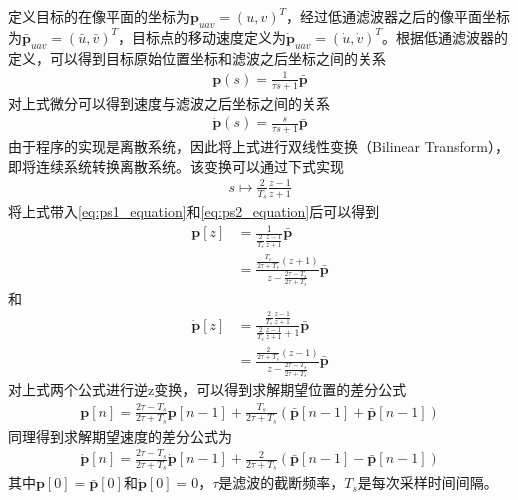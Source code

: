 定义目标的在像平面的坐标为$\mathbf{p}_{uav} = (u, v)^T$，经过低通滤波器之后的像平面坐标为$\bar{\mathbf{p}}_{uav} = (\bar{u}, \bar{v})^T$，目标点的移动速度定义为$\dot{\mathbf{p}}_{uav} = (\dot{u},\dot{v})^T$。根据低通滤波器的定义，可以得到目标原始位置坐标和滤波之后坐标之间的关系
\begin{align}
\label{eq:ps1_equation}
\mathbf{p}(s) = \frac{1}{\tau s+1}\bar{\mathbf{p}}
\end{align}
对上式微分可以得到速度与滤波之后坐标之间的关系
\begin{align}
\label{eq:ps2_equation}
\dot{\mathbf{p}}(s) = \frac{s}{\tau s+1}\bar{\mathbf{p}}
\end{align}
由于程序的实现是离散系统，因此将上式进行双线性变换（Bilinear Transform）\cite{franklin1998digital}，即将连续系统转换离散系统。该变换可以通过下式实现
\begin{align}
s \mapsto \frac{2}{T_s}\frac{z-1}{z+1}
\end{align}
将上式带入\ref{eq:ps1_equation}和\ref{eq:ps2_equation}后可以得到
\begin{align}
\mathbf{p}[z] &= \frac{1}{\frac{2}{T_s}\frac{z-1}{z+1}}\bar{\mathbf{p}} \\
&= \frac{\frac{T_s}{2\tau+T_s}(z+1)}{z-\frac{2\tau-T_s}{2\tau+T_s}}\bar{\mathbf{p}}
\end{align}
和
\begin{align}
\dot{\mathbf{p}}[z] &= \frac{\frac{2}{T_s}\frac{z-1}{z+1}}{\frac{2}{T_s}\frac{z-1}{z+1}+1}\bar{\mathbf{p}} \\
&= \frac{\frac{2}{2\tau+T_s}(z-1)}{z-\frac{2\tau-T_s}{2\tau+T_s}}\bar{\mathbf{p}}
\end{align}
对上式两个公式进行逆z变换，可以得到求解期望位置的差分公式
\begin{align}
\mathbf{p}[n] = \frac{2\tau-T_s}{2\tau+T_s} \mathbf{p}[n-1]+ \frac{T_s}{2\tau+T_s}(\bar{\mathbf{p}}[n-1] + \bar{\mathbf{p}}[n-1] )
\end{align}
同理得到求解期望速度的差分公式为
\begin{align}
\dot{\mathbf{p}}[n] = \frac{2\tau-T_s}{2\tau+T_s}\dot{\mathbf{p}}[n-1]+ \frac{2}{2\tau+T_s}(\bar{\mathbf{p}}[n-1] - \bar{\mathbf{p}}[n-1] )
\end{align}
其中$\mathbf{p}[0] = \bar{\mathbf{p}}[0]$和$\dot{\mathbf{p}}[0] = 0$，$\tau$是滤波的截断频率，$T_s$是每次采样时间间隔。


